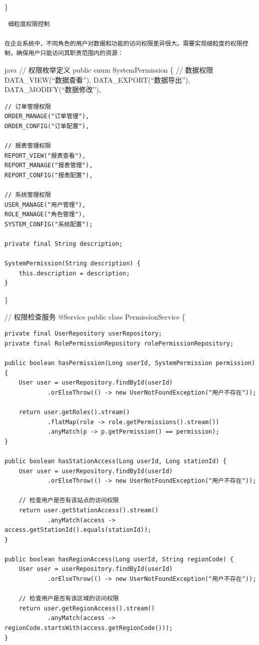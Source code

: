 \}

\begin{lstlisting}
 细粒度权限控制

在企业系统中，不同角色的用户对数据和功能的访问权限差异很大。需要实现细粒度的权限控制，确保用户只能访问其职责范围内的资源：
\end{lstlisting}

java // 权限枚举定义 public enum SystemPermission \{ // 数据权限 DATA\_VIEW(``数据查看''), DATA\_EXPORT(``数据导出''), DATA\_MODIFY(``数据修改''),

\begin{verbatim}
// 订单管理权限
ORDER_MANAGE("订单管理"),
ORDER_CONFIG("订单配置"),

// 报表管理权限
REPORT_VIEW("报表查看"),
REPORT_MANAGE("报表管理"),
REPORT_CONFIG("报表配置"),

// 系统管理权限
USER_MANAGE("用户管理"),
ROLE_MANAGE("角色管理"),
SYSTEM_CONFIG("系统配置");

private final String description;

SystemPermission(String description) {
    this.description = description;
}
\end{verbatim}

\}

// 权限检查服务 @Service public class PermissionService \{

\begin{verbatim}
private final UserRepository userRepository;
private final RolePermissionRepository rolePermissionRepository;

public boolean hasPermission(Long userId, SystemPermission permission) {
    User user = userRepository.findById(userId)
            .orElseThrow(() -> new UserNotFoundException("用户不存在"));
            
    return user.getRoles().stream()
            .flatMap(role -> role.getPermissions().stream())
            .anyMatch(p -> p.getPermission() == permission);
}

public boolean hasStationAccess(Long userId, Long stationId) {
    User user = userRepository.findById(userId)
            .orElseThrow(() -> new UserNotFoundException("用户不存在"));
            
    // 检查用户是否有该站点的访问权限
    return user.getStationAccess().stream()
            .anyMatch(access -> access.getStationId().equals(stationId));
}

public boolean hasRegionAccess(Long userId, String regionCode) {
    User user = userRepository.findById(userId)
            .orElseThrow(() -> new UserNotFoundException("用户不存在"));
            
    // 检查用户是否有该区域的访问权限
    return user.getRegionAccess().stream()
            .anyMatch(access -> regionCode.startsWith(access.getRegionCode()));
}
\end{verbatim}

